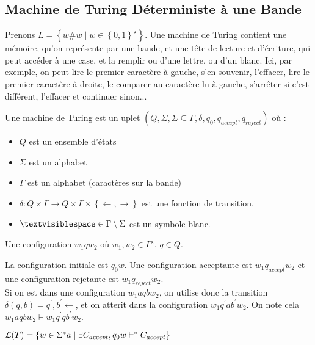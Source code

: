 \documentclass{cours}
\begin{document}
\subsection{Machine de Turing Déterministe à une Bande}
Prenons $L = \left\{w \# w \mid w \in \left\{0, 1\right\}^{\star}\right\}$. Une machine de Turing contient une mémoire, qu'on représente par une bande, et une tête de lecture et d'écriture, qui peut accéder à une case, et la remplir ou d'une lettre, ou d'un blanc. Ici, par exemple, on peut lire le premier caractère à gauche, s'en souvenir, l'effacer, lire le premier caractère à droite, le comparer au caractère lu à gauche, s'arrêter si c'est différent, l'effacer et continuer sinon...

\begin{definition}
    Une machine de Turing est un uplet $\left(Q, \Sigma, \Sigma \subseteq \Gamma, \delta, q_{0}, q_{accept}, q_{reject}\right)$ où :
    \begin{itemize}
        \item $Q$ est un ensemble d'états
        \item $\Sigma$ est un alphabet
        \item $\Gamma$ est un alphabet (caractères sur la bande)
        \item $\delta : Q \times \Gamma \rightarrow Q \times \Gamma \times \left\{\leftarrow, \rightarrow\right\}$ est une fonction de transition.
        \item $\textvisiblespace \in \Gamma \setminus \Sigma$ est un symbole blanc.
    \end{itemize}

    Une configuration $w_{1}qw_{2}$ où $w_{1}, w_{2} \in \Gamma^{\star}$, $q\in Q$. 
\end{definition}

\begin{definition}
    La configuration initiale est $q_{0}w$. Une configuration acceptante est $w_{1}q_{accept}w_{2}$ et une configuration rejetante est $w_{1}q_{reject}w_{2}$.\\
    Si on est dans une configuration $w_{1}aqbw_{2}$, on utilise donc la transition $\delta(q, b) = q^{'}, b^{'} \leftarrow$, et on atterit dans la configuration $w_{1}q^{'}ab^{'}w_{2}$. On note cela $w_{1}aqbw_{2} \vdash w_{1}q^{'}qb^{'}w_{2}$.
\end{definition}

\begin{definition}
    $\mathcal{L}(T) = \left\{w \in \Sigma^{*}a\mid \exists C_{accept}, q_{0}w \vdash^{*} C_{accept}\right\}$
\end{definition}
\end{document}
